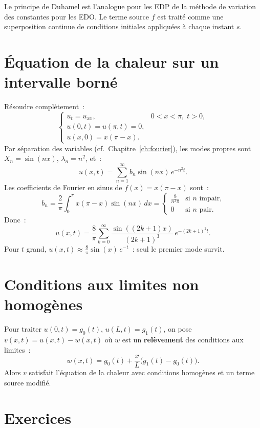 \begin{intuition}
Le principe de Duhamel est l'analogue pour les EDP de la m\'ethode de
variation des constantes pour les EDO. Le terme source $f$ est trait\'e
comme une superposition continue de conditions initiales appliqu\'ees
\`a chaque instant $s$.
\end{intuition}

\section{\'Equation de la chaleur sur un intervalle born\'e}

\begin{exemple}
R\'esoudre compl\`etement~:
\[
    \begin{cases}
        u_t = u_{xx}, & 0 < x < \pi,\; t > 0,\\
        u(0,t) = u(\pi,t) = 0,\\
        u(x,0) = x(\pi - x).
    \end{cases}
\]
Par s\'eparation des variables (cf.\ Chapitre~\ref{ch:fourier}), les modes
propres sont $X_n = \sin(nx)$, $\lambda_n = n^2$, et~:
\[
    u(x,t) = \sum_{n=1}^{\infty} b_n \sin(nx)\, e^{-n^2 t}.
\]
Les coefficients de Fourier en sinus de $f(x) = x(\pi-x)$ sont~:
\[
    b_n = \frac{2}{\pi}\int_0^\pi x(\pi-x)\sin(nx)\, dx
    = \begin{cases} \frac{8}{n^3\pi} & \text{si $n$ impair,}\\ 0 & \text{si $n$ pair.}\end{cases}
\]
Donc~:
\[
    u(x,t) = \frac{8}{\pi}\sum_{k=0}^{\infty}
    \frac{\sin((2k+1)x)}{(2k+1)^3}\, e^{-(2k+1)^2 t}.
\]
Pour $t$ grand, $u(x,t) \approx \frac{8}{\pi}\sin(x)\, e^{-t}$~:
seul le premier mode survit.
\end{exemple}

\section{Conditions aux limites non homog\`enes}

Pour traiter $u(0,t) = g_0(t)$, $u(L,t) = g_1(t)$, on pose
$v(x,t) = u(x,t) - w(x,t)$ o\`u $w$ est un \textbf{rel\`evement} des
conditions aux limites~:
\[
    w(x,t) = g_0(t) + \frac{x}{L}\bigl(g_1(t) - g_0(t)\bigr).
\]
Alors $v$ satisfait l'\'equation de la chaleur avec conditions homog\`enes
et un terme source modifi\'e.

\section{Exercices}


